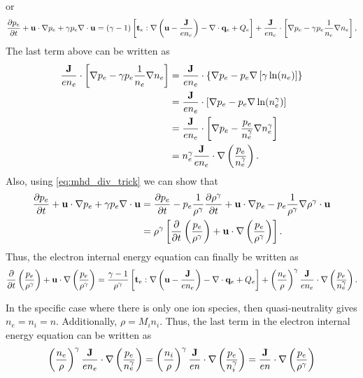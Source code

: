 \documentclass[a4paper,11pt]{report}
\begin{document}
or
\begin{equation*}
    \frac{\partial p_e}{\partial t} + \mathbf{u} \cdot \nabla p_e + \gamma p_e \nabla \cdot \mathbf{u} = (\gamma - 1) \left[ \mathbf{t}_e : \nabla \left( \mathbf{u} - \frac{\mathbf{J}}{en_e} \right) - \nabla \cdot \mathbf{q}_e + Q_e \right] + \frac{\mathbf{J}}{e n_e} \cdot \left[ \nabla p_e - \gamma p_e \frac{1}{n_e} \nabla n_e \right],
\end{equation*} 
The last term above can be written as
\begin{align*}
    \frac{\mathbf{J}}{e n_e} \cdot \left[ \nabla p_e - \gamma p_e \frac{1}{n_e} \nabla n_e \right] &= \frac{\mathbf{J}}{e n_e} \cdot \left\{ \nabla p_e - p_e \nabla \left[\gamma \ln (n_e) \right] \right\} \\
    &= \frac{\mathbf{J}}{e n_e} \cdot \left[ \nabla p_e - p_e \nabla \ln (n_e^\gamma) \right] \\
    &= \frac{\mathbf{J}}{e n_e} \cdot \left[ \nabla p_e - \frac{p_e}{n_e^\gamma} \nabla n_e^\gamma \right] \\
    &= n_e^\gamma \frac{\mathbf{J}}{e n_e} \cdot \nabla \left( \frac{p_e}{n_e^\gamma} \right).
\end{align*}
Also, using \cref{eq:mhd_div_trick} we can show that
\begin{align*}
    \frac{\partial p_e}{\partial t} + \mathbf{u} \cdot \nabla p_e + \gamma p_e \nabla \cdot \mathbf{u} 
    &=  \frac{\partial p_e}{\partial t} - p_e \frac{1}{\rho^\gamma} \frac{\partial \rho^\gamma}{\partial t} + \mathbf{u} \cdot \nabla p_e - p_e \frac{1}{\rho^\gamma} \nabla \rho^\gamma \cdot \mathbf{u} \nonumber \\
    & = \rho^\gamma \left [ \frac{\partial}{\partial t} \left( \frac{p_e}{\rho^\gamma} \right) + \mathbf{u} \cdot \nabla \left(\frac{p_e}{\rho^\gamma} \right) \right ].
\end{align*}
Thus, the electron internal energy equation can finally be written as
\begin{equation*}
    \frac{\partial}{\partial t} \left( \frac{p_e}{\rho^\gamma} \right) + \mathbf{u} \cdot \nabla \left(\frac{p_e}{\rho^\gamma} \right) = \frac{\gamma - 1}{\rho^\gamma} \left[ \mathbf{t}_e : \nabla \left( \mathbf{u} - \frac{\mathbf{J}}{en_e} \right) - \nabla \cdot \mathbf{q}_e + Q_e \right] + \left( \frac{n_e}{\rho} \right)^\gamma \frac{\mathbf{J}}{e n_e} \cdot \nabla \left( \frac{p_e}{n_e^\gamma} \right).
\end{equation*}

In the specific case where there is only one ion species, then quasi-neutrality gives $n_e = n_i = n$. Additionally, $\rho = M_i n_i$. Thus, the last term in the electron internal energy equation can be written as
\begin{equation}
    \left( \frac{n_e}{\rho} \right)^\gamma \frac{\mathbf{J}}{e n_e} \cdot \nabla \left( \frac{p_e}{n_e^\gamma} \right) = \left( \frac{n_i}{\rho} \right)^\gamma \frac{\mathbf{J}}{e n} \cdot \nabla \left( \frac{p_e}{n_i^\gamma} \right) = \frac{\mathbf{J}}{e n} \cdot \nabla \left( \frac{p_e}{\rho^\gamma} \right)
\end{equation}
\end{document}
